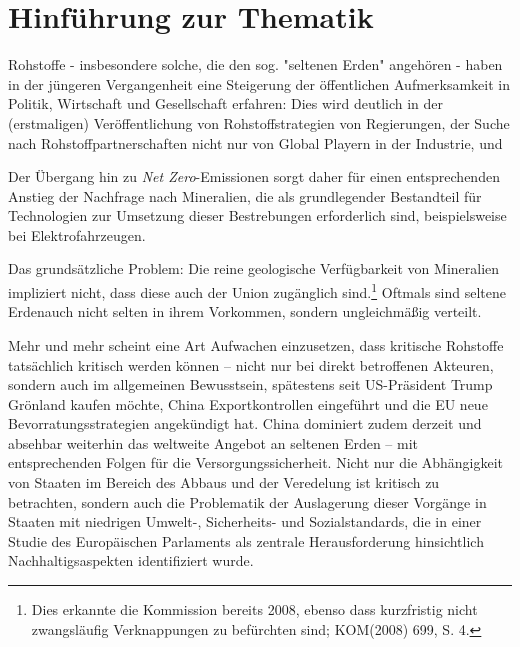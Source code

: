 \documentclass[12pt,a4paper,oneside]{book} %
\begin{document}
	
	
	
	\tableofcontents
	
	\chapter{Hinführung zur Thematik}
	
	Rohstoffe - insbesondere solche, die den sog. "seltenen Erden" angehören - haben in der jüngeren Vergangenheit eine Steigerung der öffentlichen Aufmerksamkeit in Politik, Wirtschaft und Gesellschaft erfahren: Dies wird deutlich in der (erstmaligen) Veröffentlichung von Rohstoffstrategien von Regierungen, der Suche nach Rohstoffpartnerschaften nicht nur von Global Playern in der Industrie, und 
	
	Der Übergang hin zu \textit{Net Zero}-Emissionen sorgt daher für einen entsprechenden Anstieg der Nachfrage nach Mineralien, die als grundlegender Bestandteil für Technologien zur Umsetzung dieser Bestrebungen erforderlich sind, beispielsweise bei Elektrofahrzeugen.
	
	Das grundsätzliche Problem: Die reine geologische Verfügbarkeit von Mineralien impliziert nicht, dass diese auch der Union zugänglich sind.\footnote{Dies erkannte die Kommission bereits 2008, ebenso dass kurzfristig nicht zwangsläufig Verknappungen zu befürchten sind; KOM(2008) 699, S. 4.} Oftmals sind \glqq seltene Erden\grqq auch nicht selten in ihrem Vorkommen, sondern ungleichmäßig verteilt.
	
	Mehr und mehr scheint eine Art Aufwachen einzusetzen, dass kritische Rohstoffe tatsächlich kritisch werden können -- nicht nur bei direkt betroffenen Akteuren, sondern auch im allgemeinen Bewusstsein, spätestens seit US-Präsident Trump Grönland kaufen möchte, China Exportkontrollen eingeführt und die EU neue Bevorratungsstrategien angekündigt hat. China dominiert zudem derzeit und absehbar weiterhin das weltweite Angebot an seltenen Erden -- mit entsprechenden Folgen für die Versorgungssicherheit. Nicht nur die Abhängigkeit von Staaten im Bereich des Abbaus und der Veredelung ist kritisch zu betrachten, sondern auch die Problematik der Auslagerung dieser Vorgänge in Staaten mit niedrigen Umwelt-, Sicherheits- und Sozialstandards,\autocite[siehe hierzu]{ÖAW Artikel} die in einer Studie des Europäischen Parlaments als zentrale Herausforderung hinsichtlich Nachhaltigsaspekten identifiziert wurde.\autocite[16]{The role of research and innovation in ensuring a safe and sustainable supply of critical raw materials in the EU}
	
\end{document}
